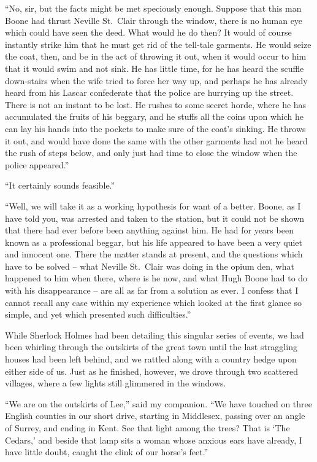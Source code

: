 “No, sir, but the facts might be met speciously enough.
Suppose that this man Boone had thrust Neville St.~Clair
through the window, there is no human eye which could have
seen the deed. What would he do then? It would of course
instantly strike him that he must get rid of the tell-tale garments.
He would seize the coat, then, and be in the act of
throwing it out, when it would occur to him that it would swim
and not sink. He has little time, for he has heard the scuffle
down-stairs when the wife tried to force her way up, and perhaps
he has already heard from his Lascar confederate that
the police are hurrying up the street. There is not an instant
to be lost. He rushes to some secret horde, where he has
accumulated the fruits of his beggary, and he stuffs all the
coins upon which he can lay his hands into the pockets to
make sure of the coat’s sinking. He throws it out, and would
have done the same with the other garments had not he heard
the rush of steps below, and only just had time to close the
window when the police appeared.”

“It certainly sounds feasible.”

“Well, we will take it as a working hypothesis for want
of a better. Boone, as I have told you, was arrested and
taken to the station, but it could not be shown that there had
ever before been anything against him. He had for years
been known as a professional beggar, but his life appeared to
have been a very quiet and innocent one. There the matter
stands at present, and the questions which have to be solved -- what
Neville St.~Clair was doing in the opium den, what happened
to him when there, where is he now, and what Hugh
Boone had to do with his disappearance -- are all as far from
a solution as ever. I confess that I cannot recall any case
within my experience which looked at the first glance so
simple, and yet which presented such difficulties.”

While Sherlock Holmes had been detailing this singular
series of events, we had been whirling through the outskirts of
the great town until the last straggling houses had been left
behind, and we rattled along with a country hedge upon
either side of us. Just as he finished, however, we drove
through two scattered villages, where a few lights still glimmered
in the windows.

“We are on the outskirts of Lee,” said my companion.
“We have touched on three English counties in our short
drive, starting in Middlesex, passing over an angle of Surrey,
and ending in Kent. See that light among the trees? That
is ‘The Cedars,’ and beside that lamp sits a woman whose
anxious ears have already, I have little doubt, caught the clink
of our horse’s feet.”

